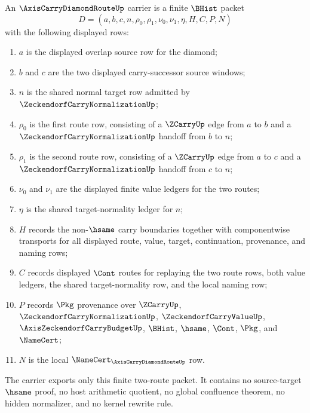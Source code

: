 \begin{definition}
\label{def:axis-carry-diamond-route-carrier}
An $\AxisCarryDiamondRouteUp$ carrier is a finite $\BHist$ packet
$$
D=(a,b,c,n,\rho_0,\rho_1,\nu_0,\nu_1,\eta,H,C,P,N)
$$
with the following displayed rows:
\begin{enumerate}
\item $a$ is the displayed overlap source row for the diamond;
\item $b$ and $c$ are the two displayed carry-successor source windows;
\item $n$ is the shared normal target row admitted by $\ZeckendorfCarryNormalizationUp$;
\item $\rho_0$ is the first route row, consisting of a $\ZCarryUp$ edge from $a$ to $b$ and a $\ZeckendorfCarryNormalizationUp$ handoff from $b$ to $n$;
\item $\rho_1$ is the second route row, consisting of a $\ZCarryUp$ edge from $a$ to $c$ and a $\ZeckendorfCarryNormalizationUp$ handoff from $c$ to $n$;
\item $\nu_0$ and $\nu_1$ are the displayed finite value ledgers for the two routes;
\item $\eta$ is the shared target-normality ledger for $n$;
\item $H$ records the non-$\hsame$ carry boundaries together with componentwise transports for all displayed route, value, target, continuation, provenance, and naming rows;
\item $C$ records displayed $\Cont$ routes for replaying the two route rows, both value ledgers, the shared target-normality row, and the local naming row;
\item $P$ records $\Pkg$ provenance over $\ZCarryUp$, $\ZeckendorfCarryNormalizationUp$, $\ZeckendorfCarryValueUp$, $\AxisZeckendorfCarryBudgetUp$, $\BHist$, $\hsame$, $\Cont$, $\Pkg$, and $\NameCert$;
\item $N$ is the local $\NameCert_{\AxisCarryDiamondRouteUp}$ row.
\end{enumerate}
The carrier exports only this finite two-route packet. It contains no source-target $\hsame$ proof, no host arithmetic quotient, no global confluence theorem, no hidden normalizer, and no kernel rewrite rule.
\end{definition}

